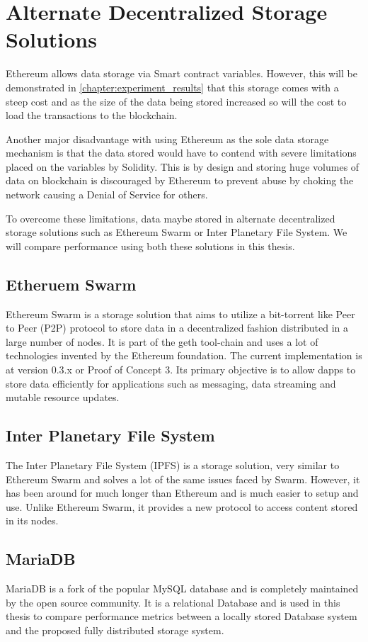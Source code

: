 \documentclass[11pt,openright]{report}
\begin{document}
\section{Alternate Decentralized Storage Solutions}
Ethereum allows data storage via Smart contract variables. However, this will be demonstrated in \ref{chapter:experiment_results} that this storage comes with a steep cost and as the size of the data being stored increased so will the cost to load the transactions to the blockchain.

Another major disadvantage with using Ethereum as the sole data storage mechanism is that the data stored would have to contend with severe limitations placed on the variables by Solidity. This is by design and storing huge volumes of data on blockchain is discouraged by Ethereum to prevent abuse by choking the network causing a Denial of Service for others.

To overcome these limitations, data maybe stored in alternate decentralized storage solutions such as Ethereum Swarm or Inter Planetary File System. We will compare performance using both these solutions in this thesis.

\subsection{Etheruem Swarm}
Ethereum Swarm is a storage solution that aims to utilize a bit-torrent like Peer to Peer (P2P) protocol to store data  in a decentralized fashion distributed in a large number of nodes. It is part of the geth tool-chain and uses a lot of technologies invented by the Ethereum foundation. The current implementation is at version 0.3.x or Proof of Concept 3. Its primary objective is to allow dapps to store data efficiently for applications such as messaging, data streaming and mutable resource updates. 

\subsection{Inter Planetary File System}
The Inter Planetary File System (IPFS) is a storage solution, very similar to Ethereum Swarm and solves a lot of the same issues faced by Swarm. However, it has been around for much longer than Ethereum and is much easier to setup and use. Unlike Ethereum Swarm, it provides a new protocol to access content stored in its nodes.

\subsection{MariaDB}
MariaDB is a fork of the popular MySQL database and is completely maintained by the open source community. It is a relational Database and is used in this thesis to compare performance metrics between a locally stored Database system and the proposed fully distributed storage system.
\end{document}
